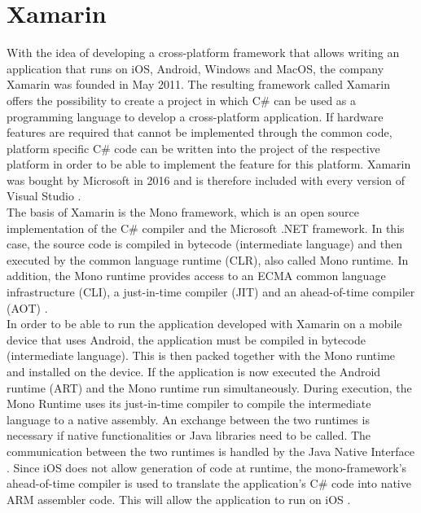 \documentclass[Bachelor,BIF,english]{twbook}
\begin{document}
\section{Xamarin}
With the idea of developing a cross-platform framework that allows writing an application that runs on iOS, Android, Windows and MacOS, the company Xamarin was founded in May 2011. The resulting framework called Xamarin offers the possibility to create a project in which C\# can be used as a programming language to develop a cross-platform application. If hardware features are required that cannot be implemented through the common code, platform specific C\# code can be written into the project of the respective platform in order to be able to implement the feature for this platform. Xamarin was bought by Microsoft in 2016 and is therefore included with every version of Visual Studio \cite[p.~14]{ZubaBernhard2017EdPb} \cite[p.~16]{LinckArne2016}.
\\[\baselineskip]
The basis of Xamarin is the Mono framework, which is an open source implementation of the C\# compiler and the Microsoft .NET framework. In this case, the source code is compiled in bytecode (intermediate language) and then executed by the common language runtime (CLR), also called Mono runtime. In addition, the Mono runtime provides access to an ECMA common language infrastructure (CLI), a just-in-time compiler (JIT) and an ahead-of-time compiler (AOT) \cite[p.~14]{ZubaBernhard2017EdPb}.
\\[\baselineskip]
In order to be able to run the application developed with Xamarin on a mobile device that uses Android, the application must be compiled in bytecode (intermediate language). This is then packed together with the Mono runtime and installed on the device. If the application is now executed the Android runtime (ART) and the Mono runtime run simultaneously. During execution, the Mono Runtime uses its just-in-time compiler to compile the intermediate language to a native assembly. An exchange between the two runtimes is necessary if native functionalities or Java libraries need to be called. The communication between the two runtimes is handled by the Java Native Interface \cite[p.~14-15]{ZubaBernhard2017EdPb} \cite[p.~456]{WillocxVossaertNaessens2015}. Since iOS does not allow generation of code at runtime, the mono-framework's ahead-of-time compiler is used to translate the application's C\# code into native ARM assembler code. This will allow the application to run on iOS\cite[p.~15]{ZubaBernhard2017EdPb} \cite[p.~456]{WillocxVossaertNaessens2015}.
\end{document}
